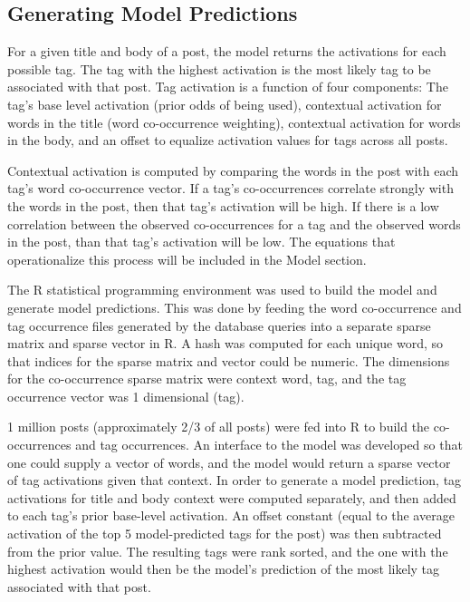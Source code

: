 \documentclass[10pt,letterpaper]{article}
\begin{document}
\subsection{Generating Model Predictions}

For a given title and body of a post, the model returns the activations for each possible tag.
The tag with the highest activation is the most likely tag to be associated with that post.
Tag activation is a function of four components:
The tag's base level activation (prior odds of being used),
contextual activation for words in the title (word co-occurrence weighting),
contextual activation for words in the body,
and an offset to equalize activation values for tags across all posts.

Contextual activation is computed by comparing the words in the post with each tag's word co-occurrence vector.
If a tag's co-occurrences correlate strongly with the words in the post, then that tag's activation will be high.
If there is a low correlation between the observed co-occurrences for a tag and the observed words in the post, than that tag's activation will be low.
The equations that operationalize this process will be included in the Model section.

The R statistical programming environment was used to build the model and generate model predictions.
This was done by feeding the word co-occurrence and tag occurrence files generated by the database queries into a separate sparse matrix and sparse vector in R.
A hash was computed for each unique word, so that indices for the sparse matrix and vector could be numeric.
The dimensions for the co-occurrence sparse matrix were context word, tag, and the tag occurrence vector was 1 dimensional (tag).

1 million posts (approximately 2/3 of all posts) were fed into R to build the co-occurrences and tag occurrences.
An interface to the model was developed so that one could supply a vector of words, and the model would return a sparse vector of tag activations given that context.
In order to generate a model prediction, tag activations for title and body context were computed separately, and then added to each tag's prior base-level activation.
An offset constant (equal to the average activation of the top 5 model-predicted tags for the post) was then subtracted from the prior value.
The resulting tags were rank sorted, and the one with the highest activation would then be the model's prediction of the most likely tag associated with that post.
\end{document}
